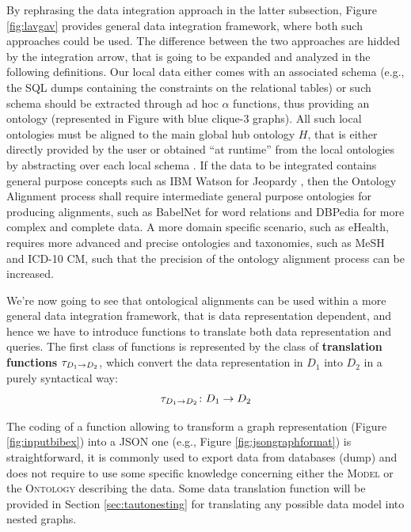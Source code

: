 \begin{example}
By rephrasing the data integration approach in the latter subsection, Figure \ref{fig:lavgav} provides general data integration framework, where both such approaches could be used. The difference between the two approaches are hidded by the \textup{integration} arrow, that is going to be expanded and analyzed in the following definitions. Our local data either comes with an associated schema (e.g., the SQL dumps containing the constraints on the relational tables) or such schema should be extracted through ad hoc $\alpha$ functions, thus providing an ontology (represented in Figure with blue clique-3 graphs). All such local ontologies must be aligned to the main global hub ontology $H$, that is either directly provided by the user or obtained ``at runtime'' from the local ontologies by abstracting over each local schema \cite{BaaziziLCGS17}. If the data to be integrated contains general purpose concepts such as IBM Watson for Jeopardy \cite{IBMWatson}, then the Ontology Alignment process shall require intermediate general purpose ontologies for producing alignments, such as BabelNet for word relations and DBPedia for more complex and complete data. A more domain specific scenario, such as eHealth, requires more advanced and precise ontologies and taxonomies, such as MeSH and ICD-10 CM, such that the precision of the ontology alignment process can be increased.
\end{example}

We're now going to see that ontological alignments can be used within a more general data integration framework, that is   data representation dependent, and hence we have to introduce functions to   translate both data representation and   queries. The first class of functions is  represented by the class of \textbf{translation functions} $\ttransl_{D_1\to D_2}$, which convert the data representation in $D_1$ into $D_2$ in a purely syntactical way:
\begin{equation}
\label{eq:taufun}
\ttranslTHIS_{D_1\to D_2}\colon D_1\to D_2
\end{equation}

\begin{example}
The coding of a function allowing to transform a graph representation (Figure \vref{fig:inputbibex}) into a JSON one (e.g., Figure \vref{fig:jsongraphformat}) is straightforward, it is commonly used to export data from databases (dump) and does not require to use some specific knowledge concerning either the \textsc{Model} or the \textsc{Ontology} describing the data. Some data translation function will be provided in Section \vref{sec:tautonesting} for translating any possible data model into nested graphs.
\end{example}

